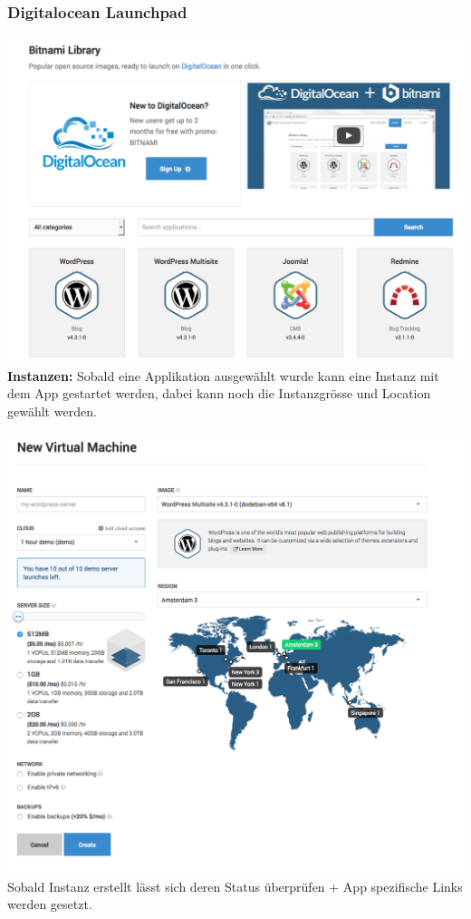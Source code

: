 \documentclass[11pt]{scrartcl}
\begin{document}
\subsubsection{Digitalocean Launchpad}
\includegraphics[width=\textwidth]{digitalocean_launchpad}
\textbf{Instanzen:}
Sobald eine Applikation ausgewählt wurde kann eine Instanz mit dem App gestartet 
werden, dabei kann noch die Instanzgrösse und Location gewählt werden.

\includegraphics[width=\textwidth]{digitalocean_size}
Sobald Instanz erstellt lässt sich deren Status überprüfen + App spezifische 
Links werden gesetzt.
\end{document}
